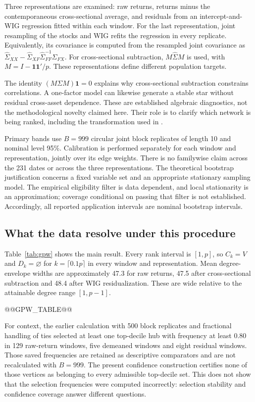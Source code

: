 \documentclass[pdflatex,sn-mathphys-ay]{sn-jnl}
\theoremstyle{thmstyleone}
\theoremstyle{thmstyletwo}
\begin{document}
Three representations are examined: raw returns, returns minus the contemporaneous cross-sectional average, and residuals from an intercept-and-WIG regression fitted within each window. For the last representation, joint resampling of the stocks and WIG refits the regression in every replicate. Equivalently, its covariance is computed from the resampled joint covariance as $\widehat\Sigma_{XX}-\widehat\Sigma_{XF}\widehat\Sigma_{FF}^{-1}\widehat\Sigma_{FX}$. For cross-sectional subtraction, $M\widehat\Sigma M$ is used, with $M=I-\mathbf1\mathbf1'/p$. These representations define different population targets.

The identity $(M\Sigma M)\mathbf1=0$ explains why cross-sectional subtraction constrains correlations. A one-factor model can likewise generate a stable star without residual cross-asset dependence. These are established algebraic diagnostics, not the methodological novelty claimed here. Their role is to clarify which network is being ranked, including the transformation used in \citet{galazka2011}.

Primary bands use $B=999$ circular joint block replicates of length 10 and nominal level 95\%. Calibration is performed separately for each window and representation, jointly over its edge weights. There is no familywise claim across the 231 dates or across the three representations. The theoretical bootstrap justification concerns a fixed variable set and an appropriate stationary sampling model. The empirical eligibility filter is data dependent, and local stationarity is an approximation; coverage conditional on passing that filter is not established. Accordingly, all reported application intervals are nominal bootstrap intervals.

\subsection{What the data resolve under this procedure}
Table~\ref{tab:gpw} shows the main result. Every rank interval is $[1,p]$, so $C_k=V$ and $D_k=\varnothing$ for $k=\lceil0.1p\rceil$ in every window and representation. Mean degree-envelope widths are approximately 47.3 for raw returns, 47.5 after cross-sectional subtraction and 48.4 after WIG residualization. These are wide relative to the attainable degree range $[1,p-1]$.

@@GPW_TABLE@@

For context, the earlier calculation with 500 block replicates and fractional handling of ties selected at least one top-decile hub with frequency at least 0.80 in 129 raw-return windows, five demeaned windows and eight residual windows. Those saved frequencies are retained as descriptive comparators and are not recalculated with $B=999$. The present confidence construction certifies none of those vertices as belonging to every admissible top-decile set. This does not show that the selection frequencies were computed incorrectly: selection stability and confidence coverage answer different questions.
\end{document}

